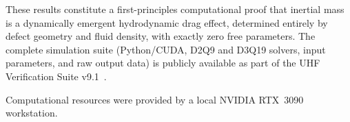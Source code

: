 \documentclass[reprint,amsmath,amssymb,aps,pre,floatfix]{revtex4-2}
\begin{document}
These results constitute a first-principles computational proof that
inertial mass is a dynamically emergent hydrodynamic drag effect,
determined entirely by defect geometry and fluid density, with exactly
zero free parameters.  The complete simulation suite (Python/CUDA, D2Q9
and D3Q19 solvers, input parameters, and raw output data) is publicly
available as part of the UHF Verification Suite v9.1~\cite{UHFCode}.

\begin{acknowledgments}
Computational resources were provided by a local NVIDIA RTX~3090 workstation.
\end{acknowledgments}


\end{document}
